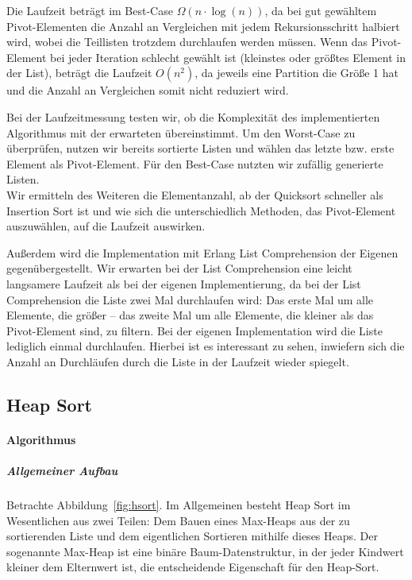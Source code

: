 Die Laufzeit beträgt im Best-Case \(\Omega (n \cdot \log(n))\), da bei
gut gewähltem Pivot-Elementen die Anzahl an Vergleichen mit jedem
Rekursionsschritt halbiert wird, wobei die Teillisten trotzdem durchlaufen
werden müssen.
Wenn das Pivot-Element bei jeder Iteration schlecht gewählt ist (kleinstes
oder größtes Element in der List), beträgt die Laufzeit \(O(n^2)\), da
jeweils eine Partition die Größe 1 hat und die Anzahl an Vergleichen
somit nicht reduziert wird.

Bei der Laufzeitmessung testen wir, ob die Komplexität des implementierten
Algorithmus mit der erwarteten übereinstimmt.
Um den Worst-Case zu überprüfen, nutzen wir bereits sortierte Listen und
wählen das letzte bzw. erste Element als Pivot-Element.
Für den Best-Case nutzten wir zufällig generierte Listen.\\

Wir ermitteln des Weiteren die Elementanzahl, ab der Quicksort schneller
als Insertion Sort ist und wie sich die unterschiedlich Methoden, das
Pivot-Element auszuwählen, auf die Laufzeit auswirken.

Außerdem wird die Implementation mit Erlang List Comprehension der
Eigenen gegenübergestellt.
Wir erwarten bei der List Comprehension eine leicht langsamere Laufzeit als
bei der eigenen Implementierung, da bei der List Comprehension die Liste
zwei Mal durchlaufen wird:
Das erste Mal um alle Elemente, die größer -- das zweite Mal
um alle Elemente, die kleiner als das Pivot-Element sind, zu filtern.
Bei der eigenen Implementation wird die Liste lediglich einmal
durchlaufen.
Hierbei ist es interessant zu sehen, inwiefern sich die Anzahl an
Durchläufen durch die Liste in der Laufzeit wieder spiegelt.


\subsection{Heap Sort}\label{subsec:heap-sort}

\paragraph{Algorithmus}\label{subsubsec:halgorithmus}

\subparagraph{Allgemeiner Aufbau}
Betrachte Abbildung~\ref{fig:hsort}.
Im Allgemeinen besteht Heap Sort im Wesentlichen aus zwei Teilen:
Dem Bauen eines Max-Heaps aus der zu sortierenden Liste und dem
eigentlichen Sortieren mithilfe dieses Heaps.
Der sogenannte Max-Heap ist eine binäre Baum-Datenstruktur, in der jeder
Kindwert kleiner dem Elternwert ist, die entscheidende Eigenschaft für
den Heap-Sort.

